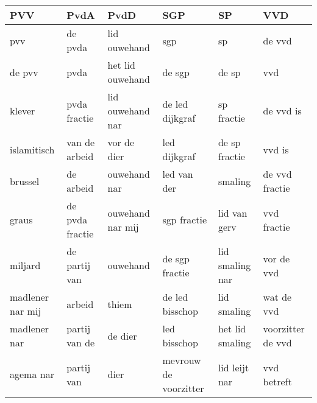\begin{tabular}{llllll}
\toprule
              PVV &             PvdA &              PvdD &                    SGP &               SP &                VVD \\
\midrule
              pvv &          de pvda &      lid ouwehand &                    sgp &               sp &             de vvd \\
           de pvv &             pvda &  het lid ouwehand &                 de sgp &            de sp &                vvd \\
           klever &     pvda fractie &  lid ouwehand nar &        de led dijkgraf &       sp fractie &          de vvd is \\
      islamitisch &    van de arbeid &       vor de dier &           led dijkgraf &    de sp fractie &             vvd is \\
          brussel &        de arbeid &      ouwehand nar &            led van der &          smaling &     de vvd fractie \\
            graus &  de pvda fractie &  ouwehand nar mij &            sgp fractie &     lid van gerv &        vvd fractie \\
          miljard &    de partij van &          ouwehand &         de sgp fractie &  lid smaling nar &         vor de vvd \\
 madlener nar mij &           arbeid &             thiem &        de led bisschop &      lid smaling &         wat de vvd \\
     madlener nar &    partij van de &           de dier &           led bisschop &  het lid smaling &  voorzitter de vvd \\
        agema nar &       partij van &              dier &  mevrouw de voorzitter &    lid leijt nar &        vvd betreft \\
\bottomrule
\end{tabular}
